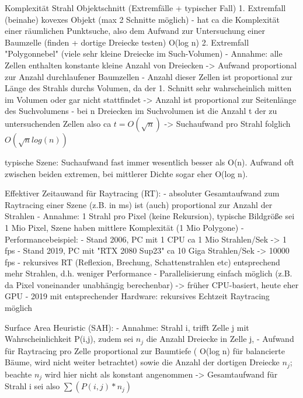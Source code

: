 \documentclass[10pt,landscape]{article}
\begin{document}
\begin{multicols}{3}
Komplexität Strahl Objektschnitt (Extremfälle + typischer Fall)
1. Extremfall (beinahe) kovexes Objekt (max 2 Schnitte möglich)
  - hat ca die Komplexität einer räumlichen Punktsuche, also dem Aufwand zur Untersuchung einer Baumzelle (finden + dortige Dreiecke testen) O(log n)
2. Extremfall "Polygonnebel" (viele sehr kleine Dreiecke im Such-Volumen)
  - Annahme: alle Zellen enthalten konstante kleine Anzahl von Dreiecken -> Aufwand proportional zur Anzahl durchlaufener Baumzellen
  - Anzahl dieser Zellen ist proportional zur Länge des Strahls durchs Volumen, da der 1. Schnitt sehr wahrscheinlich mitten im Volumen oder gar nicht stattfindet -> Anzahl ist proportional zur Seitenlänge des Suchvolumens
  - bei n Dreiecken im Suchvolumen ist die Anzahl t der zu untersuchenden Zellen also ca $t=O(\sqrt{n})$ -> Suchaufwand pro Strahl folglich $O(\sqrt{n} log (n))$

typische Szene: Suchaufwand fast immer wesentlich besser als O(n). Aufwand oft zwischen beiden extremen, bei mittlerer Dichte sogar eher O(log n).

Effektiver Zeitauwand für Raytracing (RT):
- absoluter Gesamtaufwand zum Raytracing einer Szene (z.B. in ms) ist (auch) proportional zur Anzahl der Strahlen
- Annahme: 1 Strahl pro Pixel (keine Rekursion), typische Bildgröße sei 1 Mio Pixel, Szene haben mittlere Komplexität (1 Mio Polygone)
- Performancebeispiel:
  - Stand 2006, PC mit 1 CPU ca 1 Mio Strahlen/Sek -> 1 fps
  - Stand 2019, PC mit "RTX 2080 Sup23" ca 10 Giga Strahlen/Sek -> 10000 fps
- rekursives RT (Reflexion, Brechung, Schattenstrahlen etc) entsprechend mehr Strahlen, d.h. weniger Performance
- Parallelisierung einfach möglich (z.B. da Pixel voneinander unabhängig berechenbar) -> früher CPU-basiert, heute eher GPU
- 2019 mit entsprechender Hardware: rekursives Echtzeit Raytracing möglich

Surface Area Heuristic (SAH):
- Annahme: Strahl i, trifft Zelle j mit Wahrscheinlichkeit P(i,j), zudem sei $n_j$ die Anzahl Dreiecke in Zelle j,
- Aufwand für Raytracing pro Zelle proportional zur Baumtiefe ( O(log n) für balancierte Bäume, wird nicht weiter betrachtet) sowie die Anzahl der dortigen Dreiecke $n_j$; beachte $n_j$ wird hier nicht als konstant angenommen -> Gesamtaufwand für Strahl i sei also $\sum(P(i,j)*n_j)$


\end{multicols}
\end{document}
